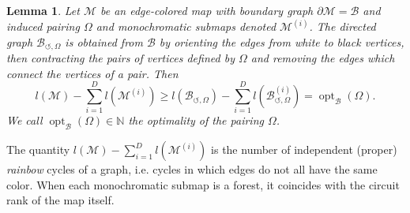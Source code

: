 \documentclass[aps,prd,10pt,notitlepage,nofootinbib,superscriptaddress,showkeys,showpacs]{revtex4-1}
\newtheorem{lemma}{Lemma}
\begin{document}
\begin{lemma}
 \label{lemma:IneqRain}
Let ${\mathcal{M}}$ be an edge-colored map with boundary graph $\partial {\mathcal{M}} = {\mathcal{B}}$ and induced pairing $\Omega$ and monochromatic submaps denoted ${\mathcal{M}}^{(i)}$.
The directed graph ${\mathcal{B}}_{\circlearrowleft,\Omega}$ is obtained from ${\mathcal{B}}$ by orienting the edges from white to black vertices, then contracting the pairs of vertices defined by $\Omega$ and removing the edges which connect the vertices of a pair. Then 
 \begin{equation}
 \label{eqref:IneqOpt}
 l({\mathcal{M}})-\sum_{i=1}^D l({\mathcal{M}}^{(i)})\ge l({\mathcal{B}}_{\circlearrowleft,\Omega})-\sum_{i=1}^D l({\mathcal{B}}_{\circlearrowleft,\Omega}^{(i)})=\operatorname{opt}_{\mathcal{B}}(\Omega).
 \end{equation}
We call $\operatorname{opt}_{\mathcal{B}}(\Omega)\in{\mathbb{N}}$ the optimality of the pairing $\Omega$.
 \end{lemma}
 
The quantity $l({\mathcal{M}})-\sum_{i=1}^D l({\mathcal{M}}^{(i)})$ is the number of independent (proper) \emph{rainbow} cycles of a graph, i.e. cycles in which edges do not all have the same color. When each monochromatic submap is a forest, it coincides with the circuit rank of the map itself.
 
\end{document}
